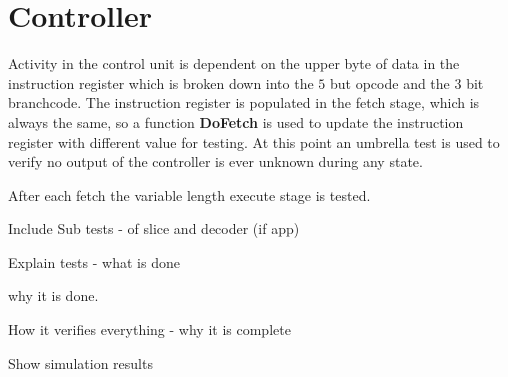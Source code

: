
\section{Controller}

Activity in the control unit is dependent on the upper byte of data in the instruction register which is broken down into the $5$ but opcode and the $3$ bit branchcode.  
The instruction register is populated in the fetch stage, which is always the same, so a function \textbf{DoFetch} is used to update the instruction register with different value for testing.
At this point an umbrella test is used to verify no output of the controller is ever unknown during any state.

After each fetch the variable length execute stage is tested.


%


Include Sub tests - of slice and decoder (if app)

Explain tests - what is done

why it is done.

How it verifies everything - why it is complete

Show simulation results

